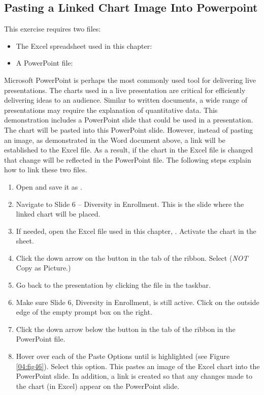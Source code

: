 \subsection{Pasting a Linked Chart Image Into Powerpoint}

This exercise requires two files:

\begin{itemize}
	\item The Excel spreadsheet used in this chapter: 
	\item A PowerPoint file: 
\end{itemize}

Microsoft PowerPoint is perhaps the most commonly used tool for delivering live presentations. The charts used in a live presentation are critical for efficiently delivering ideas to an audience. Similar to written documents, a wide range of presentations may require the explanation of quantitative data. This demonstration includes a PowerPoint slide that could be used in a presentation. The  chart will be pasted into this PowerPoint slide. However, instead of pasting an image, as demonstrated in the Word document above, a link will be established to the Excel file. As a result, if the chart in the Excel file is changed that change will be reflected in the PowerPoint file. The following steps explain how to link these two files.

\begin{enumerate}
	\item Open  and save it as .
	\item Navigate to Slide $ 6 $ – Diversity in Enrollment. This is the slide where the linked chart will be placed.
	\item If needed, open the Excel file used in this chapter, . Activate the  chart in the  sheet.
	\item Click the down arrow on the  button in the  tab of the ribbon. Select  (\textit{NOT} Copy as Picture.)
	\item Go back to the  presentation by clicking the file in the taskbar.
	\item Make sure Slide 6, Diversity in Enrollment, is still active. Click on the outside edge of the empty prompt box on the right.
	\item Click the down arrow below the  button in the  tab of the ribbon in the PowerPoint file.
	\item Hover over each of the Paste Options until  is highlighted (see Figure \ref{04:fig46}). Select this option. This pastes an image of the Excel chart into the PowerPoint slide. In addition, a link is created so that any changes made to the chart (in Excel) appear on the PowerPoint slide.
\end{enumerate}

